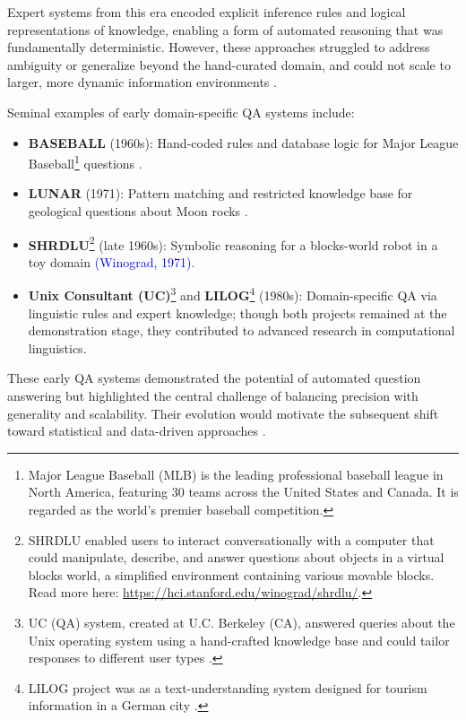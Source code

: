 \begin{spacing}{1.5}
Expert systems from this era encoded explicit inference rules and logical representations of knowledge, enabling a form of automated reasoning that was fundamentally deterministic. However, these approaches struggled to address ambiguity or generalize beyond the hand-curated domain, and could not scale to larger, more dynamic information environments \citep{noauthor_question_2025, jurafsky_chapter_2024}.

Seminal examples of early domain-specific QA systems include:
\begin{itemize}
    \item \textbf{BASEBALL} (1960s): Hand-coded rules and database logic for Major League Baseball\footnote{Major League Baseball (MLB) is the leading professional baseball league in North America, featuring 30 teams across the United States and Canada. It is regarded as the world’s premier baseball competition.} questions \citep{green_baseball_1961}.
    \item \textbf{LUNAR} (1971): Pattern matching and restricted knowledge base for geological questions about Moon rocks \citep{woods_lunar_1972}.
    \item \textbf{SHRDLU}\footnote{SHRDLU enabled users to interact conversationally with a computer that could manipulate, describe, and answer questions about objects in a virtual blocks world, a simplified environment containing various movable blocks. Read more here: \url{https://hci.stanford.edu/winograd/shrdlu/}.} (late 1960s): Symbolic reasoning for a blocks-world robot in a toy domain \textcolor{blue}{(Winograd, 1971)}.
    \item \textbf{Unix Consultant (UC)}\footnote{UC (QA) system, created at U.C. Berkeley (CA), answered queries about the Unix operating system using a hand-crafted knowledge base and could tailor responses to different user types \citep{robert_berkeley_1988}.}  and \textbf{LILOG}\footnote{LILOG project was as a text-understanding system designed for tourism information in a German city \citep{noauthor_question_2025}.} (1980s): Domain-specific QA via linguistic rules and expert knowledge; though both projects remained at the demonstration stage, they contributed to advanced research in computational linguistics.
\end{itemize}

These early QA systems demonstrated the potential of automated question answering but highlighted the central challenge of balancing precision with generality and scalability. Their evolution would motivate the subsequent shift toward statistical and data-driven approaches \citep{jurafsky_chapter_2024, antoniou_survey_2022}.


\end{spacing}
